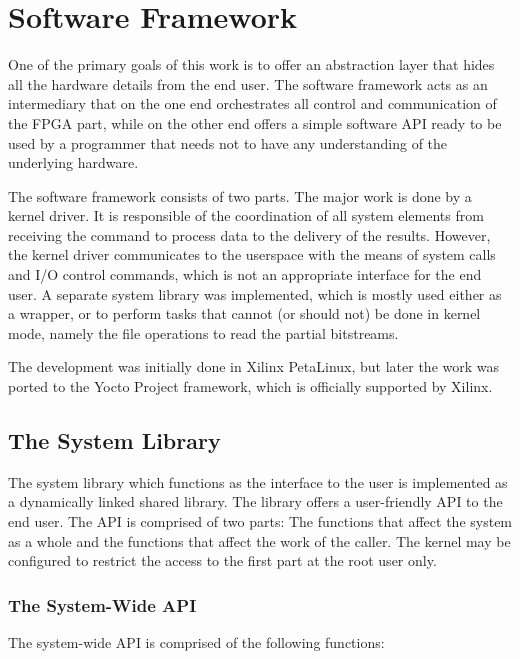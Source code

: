 \chapter{Software Framework}

One of the primary goals of this work is to offer an abstraction layer that hides
all the hardware details from the end user. The software framework acts as an intermediary
that on the one end orchestrates all control and communication of the FPGA part, while
on the other end offers a simple software API ready to be used by a programmer that needs not
to have any understanding of the underlying hardware.

The software framework consists of two parts. The major work is done by a kernel driver.
It is responsible of the coordination of all system elements from receiving the command
to process data to the delivery of the results. However, the kernel driver communicates
to the userspace with the means of system calls and I/O control commands, which is not
an appropriate interface for the end user. A separate system library was implemented,
which is mostly used either as a wrapper, or to perform tasks that cannot (or should not)
be done in kernel mode, namely the file operations to read the partial bitstreams.

The development was initially done in Xilinx PetaLinux, but later the work was
ported to the Yocto Project framework, which is officially supported by Xilinx.

\section{The System Library}

The system library which functions as the interface to the user
is implemented as a dynamically linked shared library.
The library offers a user-friendly API to the end user. The API is comprised
of two parts: The functions that affect the system as a whole and the functions
that affect the work of the caller. The kernel may be configured to restrict the access
to the first part at the root user only.


\subsection{The System-Wide API}
\label{sec:sw-api-sys}

The system-wide API is comprised of the following functions:

